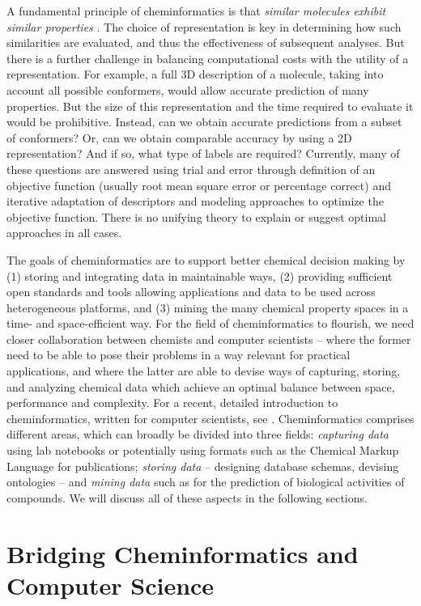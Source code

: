 \documentclass{sig-alternate}
\begin{document}
A fundamental principle of cheminformatics is that \emph{similar
molecules exhibit similar properties} \cite{Johnson:1990qf}. The
choice of representation is key in determining how such similarities
are evaluated, and thus the effectiveness of subsequent analyses. But
there is a further challenge in balancing computational costs with
the utility of a
representation. For example, a full 3D description of a molecule,
taking into account all possible conformers, would allow accurate
prediction of many properties. But the size of this representation and the
time required to evaluate it would be prohibitive. Instead, can we
obtain accurate predictions from a subset of conformers? Or, can we
obtain comparable accuracy by using a 2D representation? And if so,
what type of labels are required? Currently, many of these questions
are answered using trial and error through definition of an objective function
(usually root mean square error or percentage correct) and
iterative adaptation of descriptors and modeling approaches to
optimize the objective function. There is no
unifying theory to explain or suggest optimal approaches in all cases.

The goals of cheminformatics are to support better chemical
decision making by (1) storing and integrating data in maintainable
ways, (2) providing sufficient open standards and tools allowing
applications and data to be used across heterogeneous platforms, and
(3) mining the many chemical property spaces in a time- and
space-efficient way. For the field of cheminformatics
to flourish, we need closer
collaboration between chemists
and computer scientists -- where the former need to be able to pose
their problems in a way relevant for practical applications, and where
the latter are able to devise ways of capturing, storing, and
analyzing chemical data which achieve an optimal balance between space,
performance and complexity. For a recent,
detailed introduction to cheminformatics, written for computer
scientists, see \cite{brown2009}.
Cheminformatics comprises different areas, which can broadly
be divided into three fields: \emph{capturing data} using lab
notebooks or potentially using formats such as the Chemical Markup
Language for publications; \emph{storing data} -- designing database
schemas, devising ontologies -- and \emph{mining data} such as for the
prediction of biological activities of compounds.
We will discuss all of these aspects in the following
sections.

\section{Bridging Cheminformatics and Computer Science}
\end{document}
